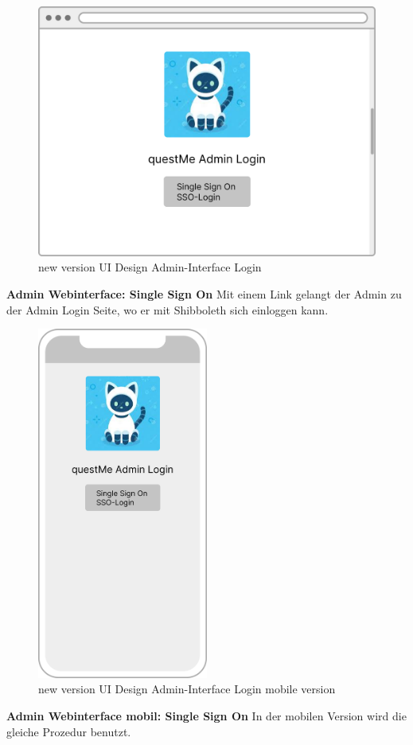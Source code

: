 \begin{figure}[H]
    \centering
    \includegraphics[width=1.0\textwidth]{bilder/new vers. UI Design/Login SSO/Admin Interface SSO.png}
    \caption{new version UI Design Admin-Interface Login}
    \label{fig:new version UI Design Admin-Interface Login}
\end{figure}
\noindent \textbf{Admin Webinterface: Single Sign On} \newline
Mit einem Link gelangt der Admin zu der Admin Login Seite, wo er mit Shibboleth sich einloggen kann. 

\begin{figure}[H]
    \centering
    \includegraphics[width=0.5\textwidth]{bilder/new vers. UI Design/Login SSO/Interface SSO v1.2.png}
    \caption{new version UI Design Admin-Interface Login mobile version}
    \label{fig:new version UI Design Admin-Interface Login mobile version}
\end{figure}
\noindent \textbf{Admin Webinterface mobil: Single Sign On} \newline
In der mobilen Version wird die gleiche Prozedur benutzt.

